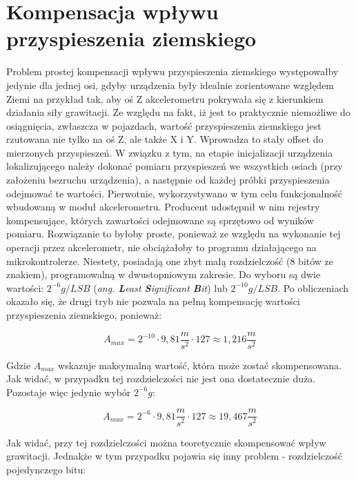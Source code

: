 \clearpage
\section{Kompensacja wpływu przyspieszenia ziemskiego}

Problem prostej kompensacji wpływu przyspieszenia ziemskiego występowałby jedynie dla jednej osi, gdyby urządzenia były idealnie zorientowane względem Ziemi na przykład tak, aby oś Z akcelerometru pokrywała się z kierunkiem działania siły grawitacji. Ze względu na fakt, iż jest to praktycznie niemożliwe do osiągnięcia, zwłaszcza w pojazdach, wartość przyspieszenia ziemskiego jest rzutowana nie tylko na oś Z, ale także X i Y. Wprowadza to stały offset do mierzonych przyspieszeń. W związku z tym, na etapie inicjalizacji urządzenia lokalizującego należy dokonać pomiaru przyspieszeń we wszystkich osiach (przy założeniu bezruchu urządzenia), a następnie od każdej próbki przyspieszenia odejmować te wartości.
Pierwotnie, wykorzystywano w tym celu funkcjonalność wbudowaną w moduł akcelerometru. Producent udostępnił w nim rejestry kompensujące, których zawartości odejmowane są sprzętowo od wyników pomiaru. Rozwiązanie to byłoby proste, ponieważ ze względu na wykonanie tej operacji przez akcelerometr, nie obciążałoby to programu działającego na mikrokontrolerze. Niestety, posiadają one zbyt małą rozdzielczość (8 bitów ze znakiem), programowalną w dwustopniowym zakresie. Do wyboru są dwie wartości: $2^{-6}g/LSB$ (\textit{ang. \textbf{L}east \textbf{S}ignificant \textbf{B}it}) lub $2^{-10}g/LSB$. 
Po obliczeniach okazało się, że drugi tryb nie pozwala na pełną kompensację wartości przyspieszenia ziemskiego, ponieważ:

\begin{equation}
A_{max} = 2^{-10} \cdot 9,81\frac{m}{s^2} \cdot 127 \approx 1,216 \frac{m}{s^2}
\end{equation}

Gdzie $A_{max}$ wskazuje maksymalną wartość, która może zostać skompensowana. Jak widać, w przypadku tej rozdzielczości nie jest ona dostatecznie duża. Pozostaje więc jedynie wybór $2^{-6} g$:

\begin{equation}
A_{max} = 2^{-6} \cdot 9,81\frac{m}{s^2} \cdot 127 \approx 19,467 \frac{m}{s^2}
\end{equation}

Jak widać, przy tej rozdzielczości można teoretycznie skompensować wpływ grawitacji. Jednakże w tym przypadku pojawia się inny problem - rozdzielczość pojedynczego bitu:

